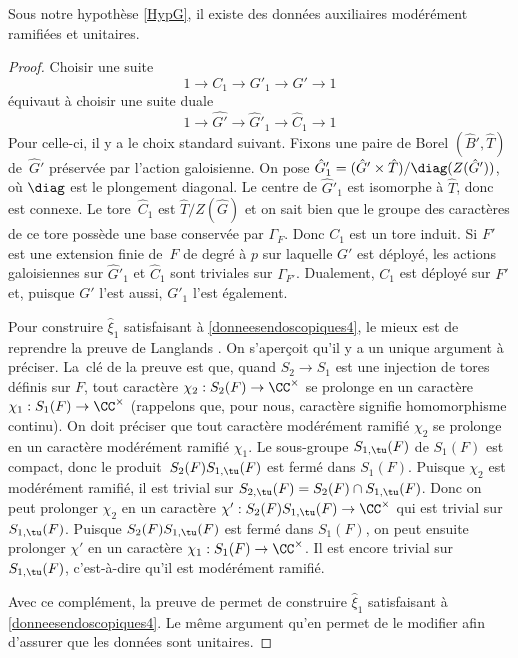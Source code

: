 \begin{lem*}
Sous notre hypothèse \ref{HypG}, il existe des données auxiliaires modérément ramifiées et unitaires.
\end{lem*}

\begin{proof}
Choisir une suite
\[
1\to C_{1}\to G'_{1}\to G'\to 1
\]
équivaut à choisir une suite duale
\[
1\to \hat{G'}\to \hat{G}'_{1}\to \hat{C}_{1}\to 1
\]
Pour celle-ci, il y a le choix standard suivant. Fixons une paire de Borel $(\hat{B}',\hat{T})$ de~$\hat{G}'$ préservée par l'action galoisienne. On pose $\hat{G}'_{1}=(\hat{G}'\times \hat{T})/\diag(Z(\hat{G}'))$, où $\diag$ est le plongement diagonal. Le centre de $\hat{G}'_{1}$ est isomorphe à $\hat{T}$, donc est connexe. Le tore~$\hat{C}_{1}$ est $\hat{T}/Z(\hat{G})$ et on sait bien que le groupe des caractères de ce tore possède une base conservée par $\Gamma_{F}$. Donc $C_{1}$ est un tore induit. Si $F'$ est une extension finie de~$F$ de degré à $p$ sur laquelle $G'$ est déployé, les actions galoisiennes sur $\hat{G}'_{1}$ et $\hat{C}_{1}$ sont triviales sur $\Gamma_{F'}$. Dualement, $C_{1}$ est déployé sur $F'$ et, puisque $G'$ l'est aussi, $G'_{1}$ l'est également.

Pour construire $\hat{\xi}_{1}$ satisfaisant à \eqref{donneesendoscopiques4}, le mieux est de reprendre la preuve de Langlands \cite[Lem.\,4]{L}. On s'aperçoit qu'il y a un unique argument à préciser. La~clé de la preuve est que, quand $S_{2}\to S_{1}$ est une injection de tores définis sur $F$, tout caractère $\chi_{2}:S_{2}(F)\to \CC^{\times}$ se prolonge en un caractère $\chi_{1}:S_{1}(F)\to \CC^{\times}$ (rappelons que, pour nous, caractère signifie homomorphisme continu). On doit préciser que tout caractère modé\-rément ramifié $\chi_{2}$ se prolonge en un caractère modérément ramifié $\chi_{1}$. Le sous-groupe $S_{1,\tu}(F)$ de $S_{1}(F)$ est compact, donc le produit~$S_{2}(F)S_{1,\tu}(F)$ est fermé dans $S_{1}(F)$. Puisque $\chi_{2}$ est modérément ramifié, il est trivial sur $S_{2,\tu}(F)=S_{2}(F)\cap S_{1,\tu}(F)$. Donc on peut prolonger $\chi_{2}$ en un caractère $\chi':S_{2}(F)S_{1,\tu}(F)\to \CC^{\times}$ qui est trivial sur $S_{1,\tu}(F)$. Puisque $S_{2}(F)S_{1,\tu}(F)$ est fermé dans $S_{1}(F)$, on peut ensuite prolonger $\chi'$ en un caractère $\chi_{1}:S_{1}(F)\to \CC^{\times}$. Il est encore trivial sur $S_{1,\tu}(F)$, c'est-à-dire qu'il est modérément ramifié.

Avec ce complément, la preuve de \cite{L} permet de construire $\hat{\xi}_{1}$ satisfaisant à \eqref{donneesendoscopiques4}. Le même argument qu'en \cite[I.7.1(3)]{MW} permet de le modifier afin d'assurer que les données sont unitaires.
\end{proof}

